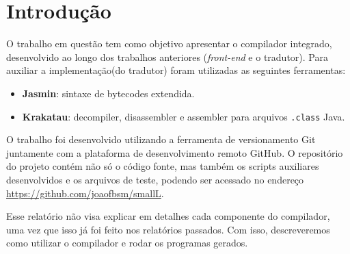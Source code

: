 \section{Introdução}

O trabalho em questão tem como objetivo apresentar o compilador integrado, desenvolvido ao longo dos trabalhos anteriores (\textit{front-end} e o tradutor). Para auxiliar a implementação(do tradutor) foram utilizadas as seguintes ferramentas:

\begin{itemize}
\item \textbf{Jasmin}\cite{trove.nla.gov.au/work/14968069}: sintaxe de bytecodes extendida.
\item \textbf{Krakatau}: decompiler, disassembler e assembler para arquivos \texttt{.class} Java.
\end{itemize}

O trabalho foi desenvolvido utilizando a ferramenta de versionamento Git juntamente com a plataforma de desenvolvimento remoto GitHub. O repositório do projeto contém não só o código fonte, mas também os scripts auxiliares desenvolvidos e os arquivos de teste, podendo ser acessado no endereço \url{https://github.com/joaofbsm/smallL}.

Esse relatório não visa explicar em detalhes cada componente do compilador, uma vez que isso já foi feito nos relatórios passados. Com isso, descreveremos como utilizar o compilador e rodar os programas gerados.